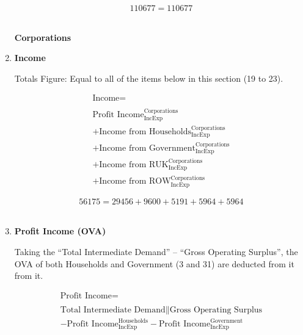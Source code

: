 \begin{enumerate}
\begin{equation} \nonumber
110677 = 110677
\end{equation}\\



\pagebreak

\begin{center}
\textbf{\LARGE Corporations}
\end{center}

\item \textbf {Income}

Totals Figure: Equal to all of the items below in this section (19 to 23).

\begin{equation}
\begin{split}
\text{Income} =  \\ \\
\text{Profit Income}^\text{Corporations}_\text{IncExp}\\
+\text{Income from Households}^\text{Corporations}_\text{IncExp}\\
+\text{Income from Government}^\text{Corporations}_\text{IncExp}\\
+\text{Income from RUK}^\text{Corporations}_\text{IncExp}\\
+\text{Income from ROW}^\text{Corporations}_\text{IncExp}
\end{split} \label{eq:2.5.22}
\end{equation}

\begin{equation} \nonumber
56175 = 29456+9600+5191+5964+5964
\end{equation}\\

\item \textbf {Profit Income (OVA)}

Taking the ``Total Intermediate Demand'' – ``Gross Operating Surplus'', the OVA of both Households and Government (3 and 31) are deducted from it from it.  \cite{ScotGov2013a,ONS2011b}

\begin{equation}
\begin{split}
\text{Profit Income} =  \\ \\
\text{Total Intermediate Demand}\|\text{Gross Operating Surplus}\\
-\text{Profit Income}^\text{Households}_\text{IncExp}-\text{Profit Income}^\text{Government}_\text{IncExp}
\end{split} \label{eq:2.5.23}
\end{equation}


\end{enumerate}
